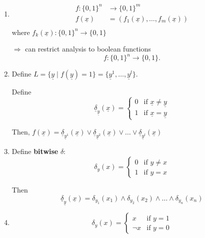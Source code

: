 \documentclass[a4paper, 12pt]{article}
\theoremstyle{plain}
\theoremstyle{definition}
\theoremstyle{remark}
\begin{document}
\begin{enumerate}[label=(\roman*)]
  \item
    \begin{align*}
      f: \{0,1\}^n &\rightarrow \{0,1\}^m \\
      f(\underline{x}) &= (f_1(\underline{x}),\ldots,f_m(\underline{x}))\\
    \end{align*}
    where $f_k(\underline{x}): \{0,1\}^n \rightarrow \{0,1\}$

    $\Longrightarrow$ can restrict analysis to boolean functions
    \begin{equation*}
      f: \{0,1\}^n \rightarrow \{0,1\}.
    \end{equation*}

  \item Define $L=\{\underline{y} \mid f(\underline{y})=1\}=\{\underline{y}^1,\ldots, \underline{y}^l \}.$

    Define
    \begin{equation*}
      \underline{\delta}_{\underline{y}}(\underline{x})=
      \begin{cases}
        0 & \text{if } \underline{x}\neq \underline{y} \\
        1 & \text{if } \underline{x}=\underline{y}
      \end{cases}
    \end{equation*}

    Then, $f(\underline{x})=\underline{\delta}_{\underline{y}^1}(\underline{x}) \lor\underline{\delta}_{\underline{y}^2}(\underline{x}) \lor\ldots \lor \underline{\delta}_{\underline{y}^l}(\underline{x})$

  \item Define \textbf{bitwise} $\delta$:
    \begin{equation*}
      \delta_y(x)=
      \begin{cases}
        0 & \text{if } y\neq x \\
        1 & \text{if } y=x
      \end{cases}
    \end{equation*}

    Then
    \begin{equation*}
      \underline{\delta}_{\underline{y}}(\underline{x})=\delta_{y_1}(x_1)\land\delta_{y_2}(x_2)\land\ldots\land\delta_{y_n}(x_n)
    \end{equation*}

  \item
    \begin{equation*}
      \delta_y(x)=
      \begin{cases}
        x & \text{if } y=1 \\
        \lnot x & \text{if } y=0
      \end{cases}
    \end{equation*}
\end{enumerate}
\end{document}
